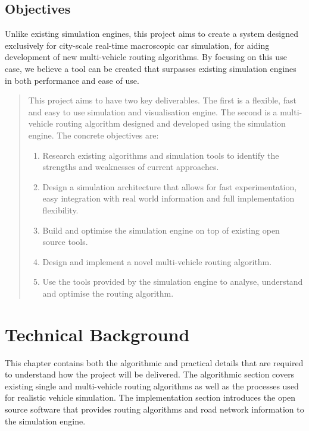 \documentclass[ %
                    author={Alexander Hill},
                supervisor={Dr. Benjamin Sach},
                    degree={MEng},
                     title={MARMOSET},
                  subtitle={Multi-Agent Route Management using Online Simulation for Efficient Transportation},
                      type={research},
                      year={2016} ]{dissertation}
\begin{document}
\section{Objectives}

Unlike existing simulation engines, this project aims to create a system
designed exclusively for city-scale real-time macroscopic car simulation, for
aiding development of new multi-vehicle routing algorithms. By focusing on this
use case, we believe a tool can be created that surpasses existing simulation
engines in both performance and ease of use.

\begin{quote}
\noindent
This project aims to have two key deliverables. The first is a flexible, fast
and easy to use simulation and visualisation engine. The second is a
multi-vehicle routing algorithm designed and developed using the simulation
engine. The concrete objectives are:

\begin{enumerate}
    \item Research existing algorithms and simulation tools to identify the
            strengths and weaknesses of current approaches.
    \item Design a simulation architecture that allows for fast experimentation,
        easy integration with real world information and full implementation
        flexibility.
    \item Build and optimise the simulation engine on top of existing open
        source tools.
    \item Design and implement a novel multi-vehicle routing algorithm.
    \item Use the tools provided by the simulation engine to analyse, understand
        and optimise the routing algorithm.
\end{enumerate}

\end{quote}


\chapter{Technical Background}
\label{chap:technical}

This chapter contains both the algorithmic and practical details that are
required to understand how the project will be delivered. The algorithmic
section covers existing single and multi-vehicle routing algorithms as well as
the processes used for realistic vehicle simulation. The implementation section
introduces the open source software that provides routing algorithms and road
network information to the simulation engine.
\end{document}
